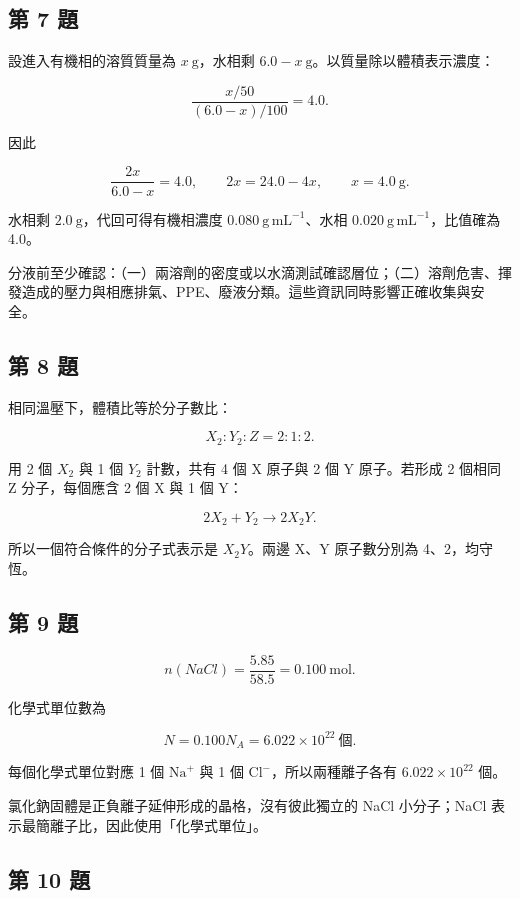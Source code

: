 \documentclass[11pt,a4paper]{article}
\begin{document}
\subsection{第 7 題}\label{ux7b2c-7-ux984c}

設進入有機相的溶質質量為 \(x\ \mathrm g\)，水相剩 \(6.0-x\ \mathrm g\)。以質量除以體積表示濃度：

\[
\frac{x/50}{(6.0-x)/100}=4.0.
\]

因此

\[
\frac{2x}{6.0-x}=4.0,
\qquad 2x=24.0-4x,
\qquad x=\boxed{4.0\ \mathrm g}.
\]

水相剩 \(2.0\ \mathrm g\)，代回可得有機相濃度 \(0.080\ \mathrm{g\,mL^{-1}}\)、水相 \(0.020\ \mathrm{g\,mL^{-1}}\)，比值確為 4.0。

分液前至少確認：（一）兩溶劑的密度或以水滴測試確認層位；（二）溶劑危害、揮發造成的壓力與相應排氣、PPE、廢液分類。這些資訊同時影響正確收集與安全。

\subsection{第 8 題}\label{ux7b2c-8-ux984c}

相同溫壓下，體積比等於分子數比：

\[
X_2:Y_2:Z=2:1:2.
\]

用 2 個 \(X_2\) 與 1 個 \(Y_2\) 計數，共有 4 個 X 原子與 2 個 Y 原子。若形成 2 個相同 Z 分子，每個應含 2 個 X 與 1 個 Y：

\[
2X_2+Y_2\longrightarrow2X_2Y.
\]

所以一個符合條件的分子式表示是 \(\boxed{X_2Y}\)。兩邊 X、Y 原子數分別為 4、2，均守恆。

\subsection{第 9 題}\label{ux7b2c-9-ux984c}

\[
n(NaCl)=\frac{5.85}{58.5}=0.100\ \mathrm{mol}.
\]

化學式單位數為

\[
N=0.100N_A=\boxed{6.022\times10^{22}\ \text{個}}.
\]

每個化學式單位對應 1 個 \(\mathrm{Na}^+\) 與 1 個 \(\mathrm{Cl}^-\)，所以兩種離子各有 \(6.022\times10^{22}\) 個。

氯化鈉固體是正負離子延伸形成的晶格，沒有彼此獨立的 NaCl 小分子；NaCl 表示最簡離子比，因此使用「化學式單位」。

\subsection{第 10 題}\label{ux7b2c-10-ux984c}
\end{document}
